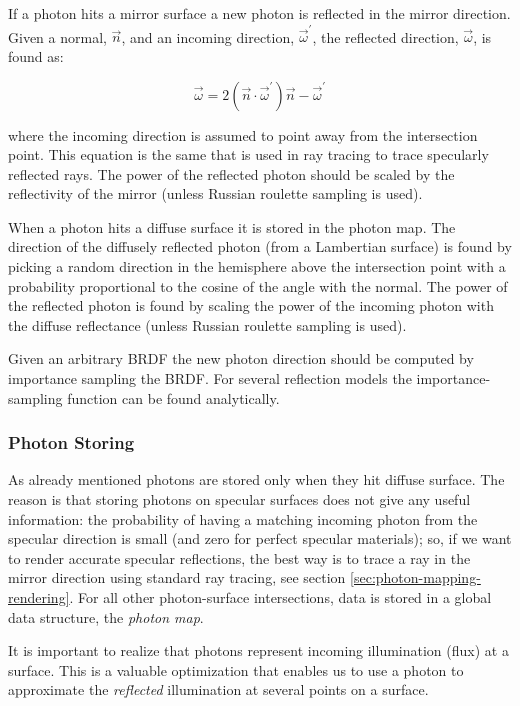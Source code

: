 If a photon hits a mirror surface a new photon is reflected in the mirror direction. Given a normal, $\vec{n}$, and an incoming direction, $\vec{\omega}^{'}$, the reflected direction, $\vec{\omega}$, is found as:

\begin{equation*}
	\vec{\omega}=2(\vec{n}\cdot\vec{\omega}^{'})\vec{n}-\vec{\omega}^{'}
\end{equation*}

where the incoming direction is assumed to point away from the intersection point. This equation is the same that is used in ray tracing to trace specularly reflected rays. The power of the reflected photon should be scaled by the reflectivity of the mirror (unless Russian roulette sampling is used).

When a photon hits a diffuse surface it is stored in the photon map. The direction of the diffusely reflected photon (from a Lambertian surface) is found by picking a random direction in the hemisphere above the intersection point with a probability proportional to the cosine of the angle with the normal. The power of the reflected photon is found by scaling the power of the incoming photon with the diffuse reflectance (unless Russian roulette sampling is used).

Given an arbitrary BRDF the new photon direction should be computed by importance sampling the BRDF. For several reflection models the importance-sampling function can be found analytically.


\subsubsection{Photon Storing}
As already mentioned photons are stored only when they hit diffuse surface. The reason is that storing photons on specular surfaces does not give any useful information: the probability of having a matching incoming photon from the specular direction is small (and zero for perfect specular materials); so, if we want to render accurate specular reflections, the best way is to trace a ray in the mirror direction using standard ray tracing, see section \ref{sec:photon-mapping-rendering}. For all other photon-surface intersections, data is stored in a global data structure, the \textit{photon map}.

It is important to realize that photons represent incoming illumination (flux) at a surface. This is a valuable optimization that enables us to use a photon to approximate the \textit{reflected} illumination at several points on a surface.

